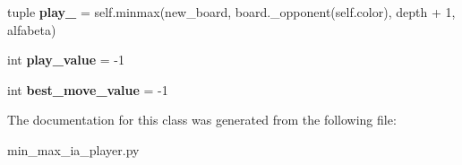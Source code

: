 \begin{DoxyCompactItemize}
\item 
\hypertarget{class_tabuleiro_othello-fork_1_1models_1_1players_1_1min__max__ia__player_1_1_minmax_player_afb0a00f5108b0eae947817fb8172f2a5}{}tuple {\bfseries play\+\_\+} = self.\+minmax(new\+\_\+board, board.\+\_\+opponent(self.\+color), depth + 1, alfabeta)\label{class_tabuleiro_othello-fork_1_1models_1_1players_1_1min__max__ia__player_1_1_minmax_player_afb0a00f5108b0eae947817fb8172f2a5}

\item 
\hypertarget{class_tabuleiro_othello-fork_1_1models_1_1players_1_1min__max__ia__player_1_1_minmax_player_a31e3861fda6cda05ffec8ef5859fca61}{}int {\bfseries play\+\_\+value} = -\/1\label{class_tabuleiro_othello-fork_1_1models_1_1players_1_1min__max__ia__player_1_1_minmax_player_a31e3861fda6cda05ffec8ef5859fca61}

\item 
\hypertarget{class_tabuleiro_othello-fork_1_1models_1_1players_1_1min__max__ia__player_1_1_minmax_player_a85a23fc555d3c276ce6fe33ba31c4ab5}{}int {\bfseries best\+\_\+move\+\_\+value} = -\/1\label{class_tabuleiro_othello-fork_1_1models_1_1players_1_1min__max__ia__player_1_1_minmax_player_a85a23fc555d3c276ce6fe33ba31c4ab5}

\end{DoxyCompactItemize}


The documentation for this class was generated from the following file\+:\begin{DoxyCompactItemize}
\item 
min\+\_\+max\+\_\+ia\+\_\+player.\+py\end{DoxyCompactItemize}
